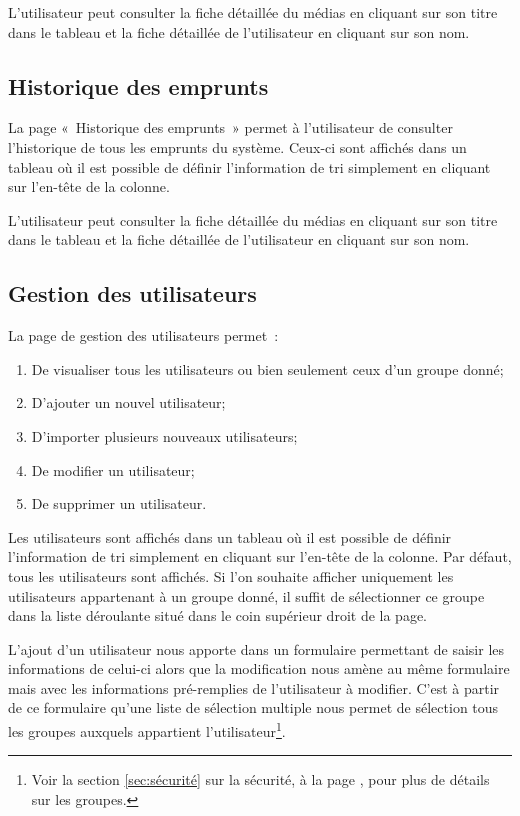 \documentclass[letter, 11pt]{report}
\begin{document}
L'utilisateur peut consulter la fiche détaillée du médias en cliquant sur son titre dans le tableau et la fiche détaillée de l'utilisateur en cliquant sur son nom.

\subsection{Historique des emprunts}
La page «~Historique des emprunts~» permet à l'utilisateur de consulter l'historique de tous les emprunts du système. Ceux-ci sont affichés dans un tableau où il est possible de définir l'information de tri simplement en cliquant sur l'en-tête de la colonne.

L'utilisateur peut consulter la fiche détaillée du médias en cliquant sur son titre dans le tableau et la fiche détaillée de l'utilisateur en cliquant sur son nom.

\subsection{Gestion des utilisateurs}
La page de gestion des utilisateurs permet~:
\begin{enumerate}
	\item De visualiser tous les utilisateurs ou bien seulement ceux d'un groupe donné;
	\item D'ajouter un nouvel utilisateur;
	\item D'importer plusieurs nouveaux utilisateurs;
	\item De modifier un utilisateur;
	\item De supprimer un utilisateur.
\end{enumerate}

Les utilisateurs sont affichés dans un tableau où il est possible de définir l'information de tri simplement en cliquant sur l'en-tête de la colonne. Par défaut, tous les utilisateurs sont affichés. Si l'on souhaite afficher uniquement les utilisateurs appartenant à un groupe donné, il suffit de sélectionner ce groupe dans la liste déroulante situé dans le coin supérieur droit de la page.

L'ajout d'un utilisateur nous apporte dans un formulaire permettant de saisir les informations de celui-ci alors que la modification nous amène au même formulaire mais avec les informations pré-remplies de l'utilisateur à modifier. C'est à partir de ce formulaire qu'une liste de sélection multiple nous permet de sélection tous les groupes auxquels appartient l'utilisateur\footnote{Voir la section \ref{sec:sécurité} sur la sécurité, à la page \pageref{sec:sécurité}, pour plus de détails sur les groupes.}.
\end{document}
